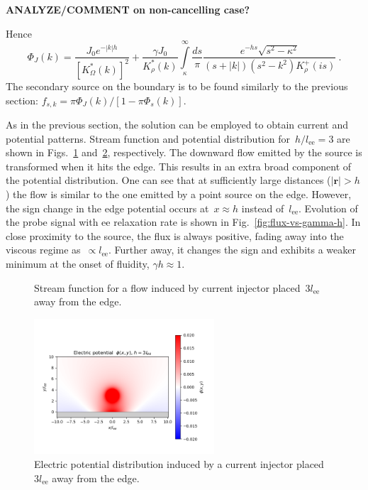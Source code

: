 \documentclass[preprint,aps,eqsecnum]{revtex4-1}
\newcommand{\fplus}[1]{{#1}^{+}}
\begin{document}
{\bf ANALYZE/COMMENT on non-cancelling case?}

Hence
\begin{equation}
\Phi_J(k) =
 \frac{J_0 e^{-|k|h}}{\left[K_\Omega^\ast(k)\right]^2}
 + \frac{\gamma J_0}{K_\rho^\ast(k)}
   \int\limits_{\kappa}^{\infty} \frac{ds}{\pi}
   \frac{e^{-hs} \sqrt{s^2 - \kappa^2}}{(s + |k|) (s^2 - k^2) \fplus{K}_\rho(is)}
   \ .
\end{equation}
The secondary source on the boundary is to be found similarly to the previous
section: $f_{s, k} = \pi \Phi_J(k)/\left[1 - \pi \Phi_s(k)\right]$.

As in the previous section, the solution can be employed to obtain current
and potential patterns. Stream function and potential distribution
for~$h/l_\mathrm{ee} = 3$ are shown in Figs.~\ref{fig:bulk-stream}
and~\ref{fig:bulk-rho}, respectively.
The downward flow emitted by the source is transformed
when it hits the edge. This results in an extra broad component of
the potential distribution. 
One can see that at sufficiently large distances ($|{\bm r}| > h$) the flow
is similar to the one emitted by a point source on the edge. However,
the sign change in the edge potential occurs at~$x \approx h$
instead of~$l_\mathrm{ee}$.
Evolution of the probe signal with ee relaxation rate is shown in
Fig.~\ref{fig:flux-vs-gamma-h}. In close proximity to the source,
the flux is always positive, fading away into the viscous regime
as~$\propto l_\mathrm{ee}$. Further away, it changes the sign
and exhibits a weaker minimum at the onset of fluidity, $\gamma h \approx 1$. 
\begin{figure}
  \def\svgwidth{0.5\textwidth}
  
  \caption{
    \label{fig:bulk-stream}
    Stream function for a flow induced by current injector
     placed~$3l_\mathrm{ee}$ away from the edge. 
  }
\end{figure}
\begin{figure}
  \includegraphics[width=0.6\textwidth]{potential-h=3.png}
  \caption{
    \label{fig:bulk-rho}
    Electric  potential distribution induced by a current injector
    placed~$3l_\mathrm{ee}$ away from the edge. 
  }
\end{figure}
\end{document}
